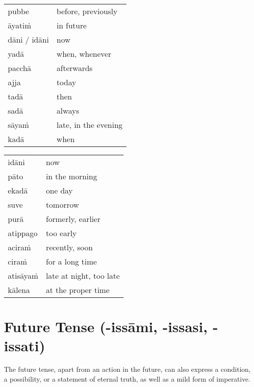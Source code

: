 \documentclass[11pt,oneside]{memoir}
\begin{document}
\begin{multicols}{2}

\begin{center}
\begin{tabular}{ll}
pubbe & before, previously\\[0pt]
āyatiṁ & in future\\[0pt]
dāni / idāni & now\\[0pt]
yadā & when, whenever\\[0pt]
pacchā & afterwards\\[0pt]
ajja & today\\[0pt]
tadā & then\\[0pt]
sadā & always\\[0pt]
sāyaṁ & late, in the evening\\[0pt]
kadā & when\\[0pt]
\end{tabular}
\end{center}

\columnbreak

\begin{center}
\begin{tabular}{ll}
idāni & now\\[0pt]
pāto & in the morning\\[0pt]
ekadā & one day\\[0pt]
suve & tomorrow\\[0pt]
purā & formerly, earlier\\[0pt]
atippago & too early\\[0pt]
aciraṁ & recently, soon\\[0pt]
ciraṁ & for a long time\\[0pt]
atisāyaṁ & late at night, too late\\[0pt]
kālena & at the proper time\\[0pt]
\end{tabular}
\end{center}

\end{multicols}

\section{Future Tense (-issāmi, -issasi, -issati)}
\label{sec:orgacd4618}

The future tense, apart from an action in the future, can also express a
condition, a possibility, or a statement of eternal truth, as well as a mild
form of imperative.
\end{document}
